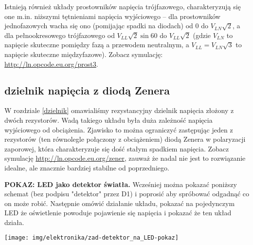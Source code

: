 Istnieją również układy prostowników napięcia trójfazowego, charakteryzują się one m.in. niższymi tętnieniami napięcia wyjściowego – dla prostowników jednofazowych wacha się ono (pomijając spadki na diodach) od $0$ do $V_{LN}\sqrt{2}$, a dla pełnookresowego trójfazowego od $V_{LL}\sqrt{2}\sin{60}$ do $V_{LL}\sqrt{2}$ (gdzie $V_{LN}$ to napięcie skuteczne pomiędzy fazą a przewodem neutralnym, a $V_{LL} = V_{LN}\sqrt{3}$ to napięcie skuteczne międzyfazowe). Zobacz symulację: \url{http://ln.opcode.eu.org/prost3}.

\subsection{dzielnik napięcia z diodą Zenera}

W rozdziale \ref{dzielnik} omawialiśmy rezystancyjny dzielnik napięcia złożony z dwóch rezystorów. Wadą takiego układu była duża zależność napięcia wyjściowego od obciążenia. Zjawisko to można ograniczyć zastępując jeden z rezystorów (ten równolegle połączony z obciążeniem) diodą Zenera w polaryzacji zaporowej, która charakteryzuje się dość stałym spadkiem napięcia. Zobacz symulację \url{http://ln.opcode.eu.org/zener}, zauważ że nadal nie jest to rozwiązanie idealne, ale znacznie bardziej stabilne od poprzedniego.

\begin {teacherOnly}\textbf{POKAZ: LED jako detektor światła.}
Wcześniej można pokazać poniższy schemat (bez podpisu "detektor" przez D1) i poprosić aby spróbować odgadnąć co on może robić.
Następnie omówić działanie układu, pokazać na pojedynczym LED że oświetlenie powoduje pojawienie się napięcia i pokazać że ten układ działa.

\texttt{[image: img/elektronika/zad-detektor\_na\_LED-pokaz]}
\end{teacherOnly}
